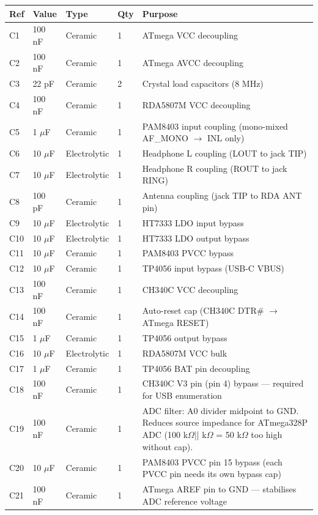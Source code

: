 \documentclass[a4paper,11pt]{article}
\renewcommand*{\,}{ }%
\begin{document}
\begin{longtable}{@{}p{1cm}p{2cm}p{2cm}p{1cm}p{6cm}@{}}
\toprule
\textbf{Ref} & \textbf{Value} & \textbf{Type} & \textbf{Qty} & \textbf{Purpose} \\
\midrule
\endhead
C1 & 100\,nF & Ceramic & 1 & ATmega VCC decoupling \\
C2 & 100\,nF & Ceramic & 1 & ATmega AVCC decoupling \\
C3 & 22\,pF & Ceramic & 2 & Crystal load capacitors (8\,MHz) \\
C4 & 100\,nF & Ceramic & 1 & RDA5807M VCC decoupling \\
C5 & 1\,$\mu$F & Ceramic & 1 & PAM8403 input coupling (mono-mixed AF\_MONO $\to$ INL only) \\
C6 & 10\,$\mu$F & Electrolytic & 1 & Headphone L coupling (LOUT to jack TIP) \\
C7 & 10\,$\mu$F & Electrolytic & 1 & Headphone R coupling (ROUT to jack RING) \\
C8 & 100\,pF & Ceramic & 1 & Antenna coupling (jack TIP to RDA ANT pin) \\
C9 & 10\,$\mu$F & Electrolytic & 1 & HT7333 LDO input bypass \\
C10 & 10\,$\mu$F & Electrolytic & 1 & HT7333 LDO output bypass \\
C11 & 10\,$\mu$F & Ceramic & 1 & PAM8403 PVCC bypass \\
C12 & 10\,$\mu$F & Ceramic & 1 & TP4056 input bypass (USB-C VBUS) \\
C13 & 100\,nF & Ceramic & 1 & CH340C VCC decoupling \\
C14 & 100\,nF & Ceramic & 1 & Auto-reset cap (CH340C DTR\# $\to$ ATmega RESET) \\
C15 & 1\,$\mu$F & Ceramic & 1 & TP4056 output bypass \\
C16 & 10\,$\mu$F & Electrolytic & 1 & RDA5807M VCC bulk \\
C17 & 1\,$\mu$F & Ceramic & 1 & TP4056 BAT pin decoupling \\
C18 & 100\,nF & Ceramic & 1 & CH340C V3 pin (pin 4) bypass --- required for USB enumeration \\
C19 & 100\,nF & Ceramic & 1 & ADC filter: A0 divider midpoint to GND. Reduces source impedance for ATmega328P ADC (100\,k$\Omega$\;||\;100\,k$\Omega$ = 50\,k$\Omega$ too high without cap). \\
C20 & 10\,$\mu$F & Ceramic & 1 & PAM8403 PVCC pin 15 bypass (each PVCC pin needs its own bypass cap) \\
C21 & 100\,nF & Ceramic & 1 & ATmega AREF pin to GND --- stabilises ADC reference voltage \\
\bottomrule
\end{longtable}
\end{document}
